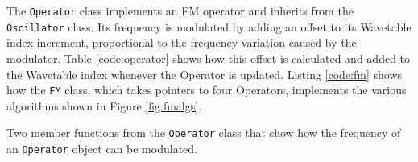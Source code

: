   The \texttt{Operator} class implements an FM operator and inherits from the \texttt{Oscillator} class. Its frequency is modulated by adding an offset to its Wavetable index increment, proportional to the frequency variation caused by the modulator. Table \ref{code:operator} shows how this offset is calculated and added to the Wavetable index whenever the Operator is updated. Listing \ref{code:fm} shows how the \texttt{FM} class, which takes pointers to four Operators, implements the various algorithms shown in Figure \ref{fig:fmalgs}.

  \begin{table}[hb!]
    \caption{Two member functions from the \texttt{Operator} class that show how the frequency of an \texttt{Operator} object can be modulated.}
    \label{code:operator}
  \end{table}
